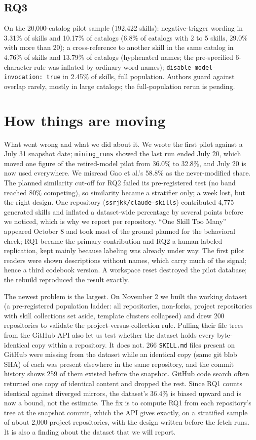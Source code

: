 \documentclass[10pt]{article}
\begin{document}
\subsection{RQ3}
On the 20,000-catalog pilot sample (192,422 skills): negative-trigger wording in 3.31\% of skills and 10.17\% of
catalogs (6.8\% of catalogs with 2 to 5 skills, 29.0\% with more than 20); a cross-reference to another skill in the same
catalog in 4.76\% of skills and 13.79\% of catalogs (hyphenated names; the pre-specified 6-character rule was inflated by
ordinary-word names); \texttt{disable-model-invocation: true} in 2.45\% of skills, full population. Authors guard against overlap
rarely, mostly in large catalogs; the full-population rerun is pending.

\section{How things are moving}
What went wrong and what we did about it. We wrote the first pilot against a July 31 snapshot date; \texttt{mining\_runs}
showed the last run ended July 20, which moved one figure of the retired-model pilot from 36.0\% to 32.8\%, and July 20
is now used everywhere. We misread Gao et al.'s 58.8\% as the never-modified share. The planned
similarity cut-off for RQ2 failed its pre-registered test (no band reached 80\% competing), so similarity became a
stratifier only; a week lost, but the right design. One repository (\texttt{ssrjkk/claude-skills}) contributed 4,775
generated skills and inflated a dataset-wide percentage by several points before we noticed, which is why we report per
repository. ``One Skill Too Many'' appeared October 8 and took most of the ground planned for the behavioral check; RQ1
became the primary contribution and RQ2 a human-labeled replication, kept mainly because labeling was already under way.
The first pilot readers were shown descriptions without names, which carry much of the signal; hence a third codebook
version. A workspace reset destroyed the pilot database; the rebuild reproduced the result exactly.

The newest problem is the largest. On November 2 we built the working dataset (a pre-registered population ladder:
all repositories, non-forks, project repositories with skill collections set aside, template clusters collapsed) and
drew 200 repositories to validate the project-versus-collection rule. Pulling their file trees from the GitHub API also let
us test whether the dataset holds every byte-identical copy within a repository. It does not. 266 \texttt{SKILL.md} files present on GitHub were missing from the dataset while an identical
copy (same git blob SHA) of each was present elsewhere in the same repository, and the commit history shows 259 of them
existed before the snapshot. GitHub code search often returned one copy of identical content and dropped the rest. Since RQ1 counts identical against diverged mirrors, the dataset's 36.4\% is biased upward and is now
a bound, not the estimate. The fix is to compute RQ1 from each repository's tree at the snapshot commit, which the API gives exactly, on a
stratified sample of about 2,000 project repositories, with the design written before the fetch runs. It is also a
finding about the dataset that we will report.
\end{document}

